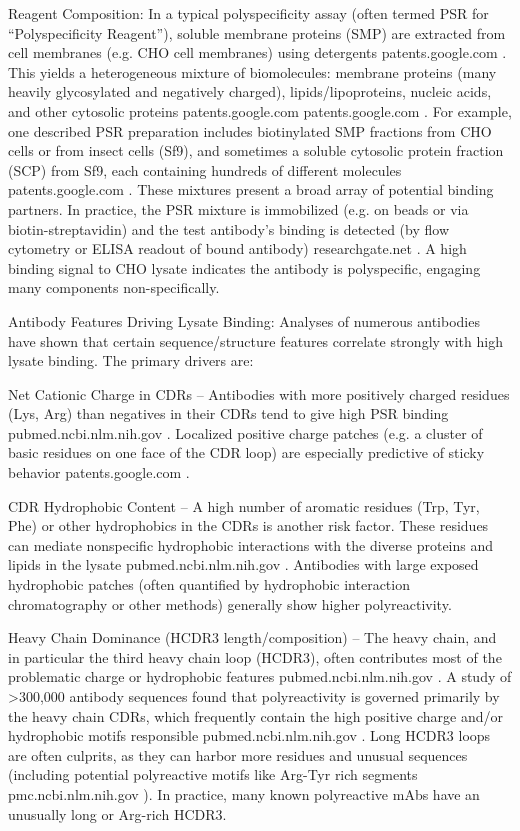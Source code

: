 Reagent Composition: In a typical polyspecificity assay (often termed PSR for “Polyspecificity Reagent”), soluble membrane proteins (SMP) are extracted from cell membranes (e.g. CHO cell membranes) using detergents
patents.google.com
. This yields a heterogeneous mixture of biomolecules: membrane proteins (many heavily glycosylated and negatively charged), lipids/lipoproteins, nucleic acids, and other cytosolic proteins
patents.google.com
patents.google.com
. For example, one described PSR preparation includes biotinylated SMP fractions from CHO cells or from insect cells (Sf9), and sometimes a soluble cytosolic protein fraction (SCP) from Sf9, each containing hundreds of different molecules
patents.google.com
. These mixtures present a broad array of potential binding partners. In practice, the PSR mixture is immobilized (e.g. on beads or via biotin-streptavidin) and the test antibody’s binding is detected (by flow cytometry or ELISA readout of bound antibody)
researchgate.net
. A high binding signal to CHO lysate indicates the antibody is polyspecific, engaging many components non-specifically.

Antibody Features Driving Lysate Binding: Analyses of numerous antibodies have shown that certain sequence/structure features correlate strongly with high lysate binding. The primary drivers are:

Net Cationic Charge in CDRs – Antibodies with more positively charged residues (Lys, Arg) than negatives in their CDRs tend to give high PSR binding
pubmed.ncbi.nlm.nih.gov
. Localized positive charge patches (e.g. a cluster of basic residues on one face of the CDR loop) are especially predictive of sticky behavior
patents.google.com
.

CDR Hydrophobic Content – A high number of aromatic residues (Trp, Tyr, Phe) or other hydrophobics in the CDRs is another risk factor. These residues can mediate nonspecific hydrophobic interactions with the diverse proteins and lipids in the lysate
pubmed.ncbi.nlm.nih.gov
. Antibodies with large exposed hydrophobic patches (often quantified by hydrophobic interaction chromatography or other methods) generally show higher polyreactivity.

Heavy Chain Dominance (HCDR3 length/composition) – The heavy chain, and in particular the third heavy chain loop (HCDR3), often contributes most of the problematic charge or hydrophobic features
pubmed.ncbi.nlm.nih.gov
. A study of >300,000 antibody sequences found that polyreactivity is governed primarily by the heavy chain CDRs, which frequently contain the high positive charge and/or hydrophobic motifs responsible
pubmed.ncbi.nlm.nih.gov
. Long HCDR3 loops are often culprits, as they can harbor more residues and unusual sequences (including potential polyreactive motifs like Arg-Tyr rich segments
pmc.ncbi.nlm.nih.gov
). In practice, many known polyreactive mAbs have an unusually long or Arg-rich HCDR3.

